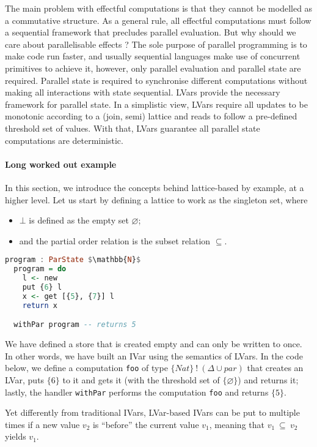 \documentclass[main.tex]{subfiles}
\begin{document}
The main problem with effectful computations is that they cannot be modelled as a commutative structure. As a general rule, all effectful computations must follow a sequential framework that precludes parallel evaluation. But why should we care about parallelisable effects ? The sole purpose of parallel programming is to make code run faster, and usually sequential languages make use of concurrent primitives to achieve it, however, only parallel evaluation and parallel state are required. Parallel state is required to synchronise different computations without making all interactions with state sequential. LVars provide the necessary framework for parallel state. In a simplistic view, LVars require all updates to be monotonic according to a (join, semi) lattice and reads to follow a pre-defined threshold set of values. With that, LVars guarantee all parallel state computations are deterministic.

\paragraph{Long worked out example}
In this section, we introduce the concepts behind lattice-based by example, at a higher
level. Let us start by defining a lattice to work as the singleton set,
where
\begin{itemize}
\item $\bot$ is defined as the empty set $\varnothing$;
\item and the partial order relation is the subset relation $\subseteq$.
\end{itemize}

\begin{lstlisting}[language=Haskell]
  program : ParState $\mathbb{N}$
  program = do
    l <- new
    put {6} l
    x <- get [{5}, {7}] l
    return x

  withPar program -- returns 5
\end{lstlisting}

We have defined a store that is created empty and can only be
written to once. In other words, we have built an IVar using the semantics of
LVars. In the code below, we define a computation {\tt foo} of type $\{ Nat \} \> ! \>
(\Delta \cup \textit{par})$ that creates an LVar, puts $\{ 6 \}$ to it and gets
it (with the threshold set of $\{ \varnothing \}$) and returns it; lastly, the
handler {\tt withPar} performs the computation {\tt foo} and returns $\{ 5 \}$.

Yet differently from traditional IVars, LVar-based IVars can be put to multiple
times if a new value $v_2$ is ``before'' the current value $v_1$, meaning that $v_1
\> \subseteq \> v_2$ yields $v_1$.
\end{document}
